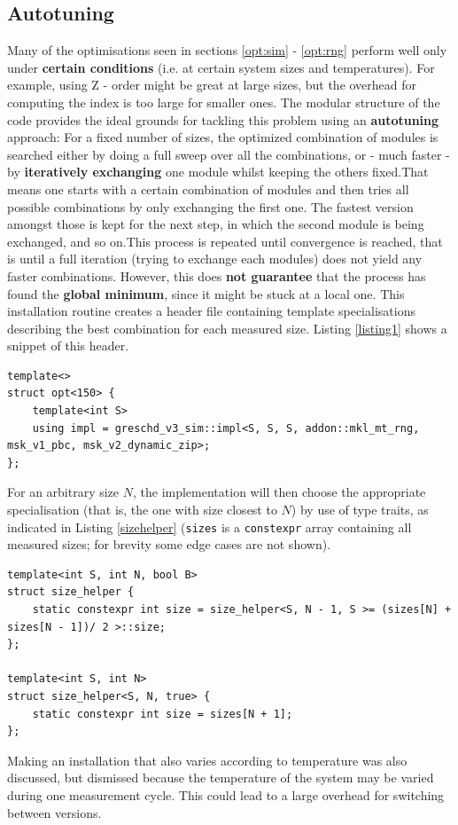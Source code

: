 \documentclass[letterpaper]{article}
\begin{document}
\subsection{Autotuning}\label{opt:autotuning}
Many of the optimisations seen in sections \ref{opt:sim} - \ref{opt:rng} perform well only under \textbf{certain conditions} (i.e. at certain system sizes and temperatures). For example, using Z - order might be great at large sizes, but the overhead for computing the index is too large for smaller ones. \newline
The modular structure of the code provides the ideal grounds for tackling this problem using an \textbf{autotuning} approach:\newline
For a fixed number of sizes, the optimized combination of modules is searched either by doing a full sweep over all the combinations, or - much faster - by \textbf{iteratively exchanging} one module whilst keeping the others fixed.\newline That means one starts with a certain combination of modules and then tries all possible combinations by only exchanging the first one. The fastest version amongst those is kept for the next step, in which the second module is being exchanged, and so on.\newline This process is repeated until convergence is reached, that is until a full iteration (trying to exchange each modules) does not yield any faster combinations. However, this does \textbf{not guarantee} that the process has found the \textbf{global minimum}, since it might be stuck at a local one.\newline 
This installation routine creates a header file containing template specialisations describing the best combination for each measured size. Listing \ref{listing1} shows a snippet of this header.\newline
\begin{lstlisting}[caption = {example for a template specialisation}, label = listing1]
template<>
struct opt<150> {
    template<int S>
    using impl = greschd_v3_sim::impl<S, S, S, addon::mkl_mt_rng, msk_v1_pbc, msk_v2_dynamic_zip>; 
};
\end{lstlisting}
For an arbitrary size $N$, the implementation will then choose the appropriate specialisation (that is, the one with size closest to $N$) by use of type traits, as indicated in Listing \ref{sizehelper} (\texttt{sizes} is a \texttt{constexpr} array containing all measured sizes; for brevity some edge cases are not shown).
\begin{lstlisting}[label = sizehelper, caption = {size\_helper (partial), part of the type traits}]
template<int S, int N, bool B>
struct size_helper {
    static constexpr int size = size_helper<S, N - 1, S >= (sizes[N] + sizes[N - 1])/ 2 >::size;
};

template<int S, int N>
struct size_helper<S, N, true> {
    static constexpr int size = sizes[N + 1];
};
\end{lstlisting}
Making an installation that also varies according to temperature was also discussed, but dismissed because the temperature of the system may be varied during one measurement cycle. This could lead to a large overhead for switching between versions.
\end{document}
